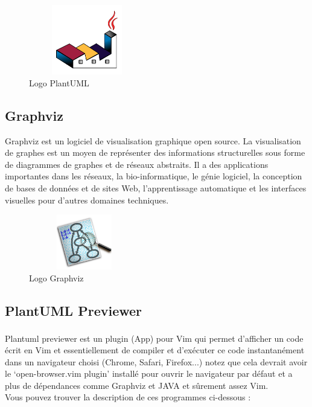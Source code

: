 \documentclass[12pt]{report}
\begin{document}
\vspace{-0.2in}

\begin{figure}[h]
\centering
    \includegraphics[width = 2in, height = 1.2in]{../Images/plantuml.png}
\vspace{-0.1in}
\caption{Logo PlantUML}
\end{figure}

\vspace*{-0.3in}

\subsection{Graphviz}
Graphviz est un logiciel de visualisation graphique open source. La visualisation de graphes est un moyen de représenter des informations structurelles sous forme de diagrammes de graphes et de réseaux abstraits. Il a des applications importantes dans les réseaux, la bio-informatique, le génie logiciel, la conception de bases de données et de sites Web, l'apprentissage automatique et les interfaces visuelles pour d'autres domaines techniques.

\begin{figure}[h]
\centering
    \includegraphics[width = 1.9in, height = 0.95in]{../Images/GraphvizLogo.png}
    \caption{Logo Graphviz}
\end{figure}

\newpage

\subsection{PlantUML Previewer}
Plantuml previewer est un plugin (App) pour Vim\textsuperscript{\cite{vim}} qui permet d'afficher un code écrit en Vim et essentiellement de compiler et d'exécuter ce code instantanément dans un navigateur choisi (Chrome, Safari, Firefox...) notez que cela devrait avoir le `open-browser.vim  plugin' installé pour ouvrir le navigateur par défaut et a plus de dépendances comme Graphviz et JAVA et sûrement assez Vim.
\\
Vous pouvez trouver la description de ces programmes ci-dessous :
\end{document}
